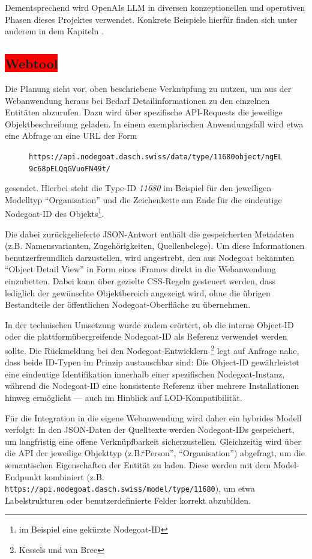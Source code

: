 \documentclass[12pt, a4paper, ngerman, bidi=default]{article}
\newcommand{\code}[1]{\colorbox{VeryLightGray}{\texttt{#1}}} %
\begin{document}
Dementsprechend wird OpenAIs LLM in diversen konzeptionellen und operativen Phasen dieses Projektes verwendet. Konkrete Beispiele hierfür finden sich unter anderem in dem Kapiteln .

\subsection{\colorbox{red}{Webtool}}\label{subsec:webtool_chapter}
Die Planung sieht vor, oben beschriebene Verknüpfung zu nutzen, um aus der Webanwendung heraus bei Bedarf Detailinformationen zu den einzelnen Entitäten abzurufen. 
Dazu wird über spezifische API-Requests die jeweilige Objektbeschreibung geladen. In einem exemplarischen Anwendungsfall wird etwa eine Abfrage an eine URL der Form
\begin{figure}
  \hspace*{-0.6cm}%
  \centering\code{https://api.nodegoat.dasch.swiss/data/type/\colorbox{MediumGray}{11680}object/ngEL9c68pELQqGVuoFN49t/}
\end{figure}
gesendet. Hierbei steht die Type-ID \textit{11680} im Beispiel für den jeweiligen Modelltyp \enquote{Organisation} und die Zeichenkette am Ende für die eindeutige Nodegoat-ID 
des Objekts\footnote{im Beispiel eine gekürzte Nodegoat-ID}.

Die dabei zurückgelieferte JSON-Antwort enthält die gespeicherten Metadaten (z.B. Namensvarianten, Zugehörigkeiten, Quellenbelege). Um diese Informationen benutzerfreundlich darzustellen, 
wird angestrebt, den aus Nodegoat bekannten \enquote{Object Detail View} in Form eines iFrames direkt in die Webanwendung einzubetten. Dabei kann über gezielte CSS-Regeln gesteuert werden, dass 
lediglich der gewünschte Objektbereich angezeigt wird, ohne die übrigen Bestandteile der öffentlichen Nodegoat-Oberfläche zu übernehmen.

In der technischen Umsetzung wurde zudem erörtert, ob die interne Object-ID oder die plattformübergreifende Nodegoat-ID als Referenz verwendet werden sollte. Die Rückmeldung bei den
Nodegoat-Entwicklern \footnote{Kessels und van Bree} legt auf Anfrage nahe, dass beide ID-Typen im Prinzip austauschbar sind: Die Object-ID gewährleistet eine eindeutige Identifikation 
innerhalb einer spezifischen Nodegoat-Instanz, 
während die Nodegoat-ID eine konsistente Referenz über mehrere Installationen hinweg ermöglicht — auch im Hinblick auf LOD-Kompatibilität.

Für die Integration in die eigene Webanwendung wird daher ein hybrides Modell verfolgt: In den JSON-Daten der Quelltexte werden Nodegoat-IDs gespeichert, um langfristig eine offene Verknüpfbarkeit sicherzustellen. 
Gleichzeitig wird über die API der jeweilige Objekttyp (z.B.\enquote{Person}, \enquote{Organisation}) abgefragt, um die semantischen Eigenschaften der Entität zu laden. Diese werden mit dem 
Model-Endpunkt kombiniert (z.B. \code{https://api.nodegoat.dasch.swiss/model/type/11680}), um etwa Labelstrukturen oder benutzerdefinierte Felder korrekt abzubilden.
\end{document}
